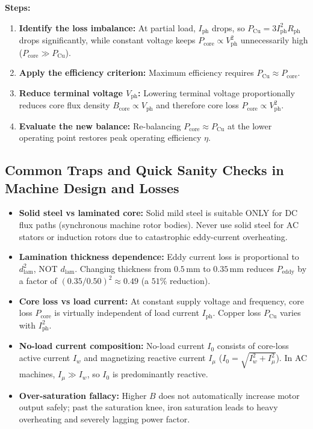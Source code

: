 \textbf{Steps:}
\begin{enumerate}
  \item \textbf{Identify the loss imbalance:} At partial load, $I_{\mathrm{ph}}$ drops, so $P_{\mathrm{Cu}} = 3 I_{\mathrm{ph}}^2 R_{\mathrm{ph}}$ drops significantly, while constant voltage keeps $P_{\mathrm{core}} \propto V_{\mathrm{ph}}^2$ unnecessarily high ($P_{\mathrm{core}} \gg P_{\mathrm{Cu}}$).
  \item \textbf{Apply the efficiency criterion:} Maximum efficiency requires $P_{\mathrm{Cu}} \approx P_{\mathrm{core}}$.
  \item \textbf{Reduce terminal voltage $V_{\mathrm{ph}}$:} Lowering terminal voltage proportionally reduces core flux density $B_{\mathrm{core}} \propto V_{\mathrm{ph}}$ and therefore core loss $P_{\mathrm{core}} \propto V_{\mathrm{ph}}^2$.
  \item \textbf{Evaluate the new balance:} Re-balancing $P_{\mathrm{core}} \approx P_{\mathrm{Cu}}$ at the lower operating point restores peak operating efficiency $\eta$.
\end{enumerate}

\subsection{Common Traps and Quick Sanity Checks in Machine Design and Losses}
\begin{itemize}
  \item \textbf{Solid steel vs laminated core:} Solid mild steel is suitable ONLY for DC flux paths (synchronous machine rotor bodies). Never use solid steel for AC stators or induction rotors due to catastrophic eddy-current overheating.
  \item \textbf{Lamination thickness dependence:} Eddy current loss is proportional to $d_{\mathrm{lam}}^2$, NOT $d_{\mathrm{lam}}$. Changing thickness from $0.5\,\mathrm{mm}$ to $0.35\,\mathrm{mm}$ reduces $P_{\mathrm{eddy}}$ by a factor of $(0.35/0.50)^2 \approx 0.49$ (a $51\%$ reduction).
  \item \textbf{Core loss vs load current:} At constant supply voltage and frequency, core loss $P_{\mathrm{core}}$ is virtually independent of load current $I_{\mathrm{ph}}$. Copper loss $P_{\mathrm{Cu}}$ varies with $I_{\mathrm{ph}}^2$.
  \item \textbf{No-load current composition:} No-load current $I_0$ consists of core-loss active current $I_w$ and magnetizing reactive current $I_\mu$ ($I_0 = \sqrt{I_w^2 + I_\mu^2}$). In AC machines, $I_\mu \gg I_w$, so $I_0$ is predominantly reactive.
  \item \textbf{Over-saturation fallacy:} Higher $B$ does not automatically increase motor output safely; past the saturation knee, iron saturation leads to heavy overheating and severely lagging power factor.
\end{itemize}
